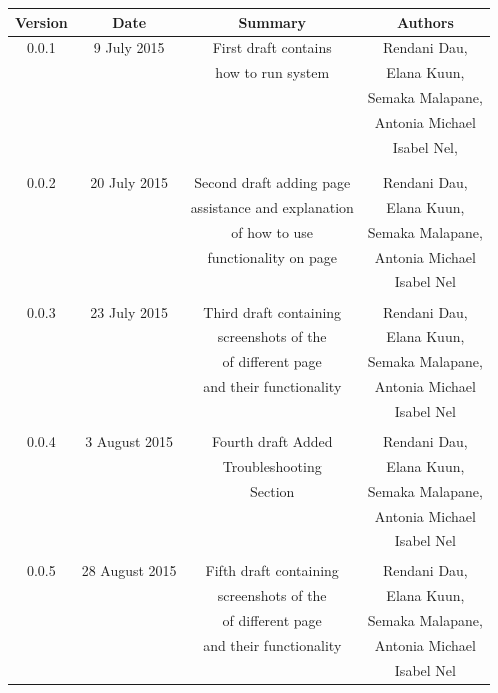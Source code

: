 \documentclass[a4paper,12pt]{report}
\begin{document}
\begin{table}[h!]
\centering
 \begin{tabular}{||c c c c||} 
 \hline
 \textbf{Version} & \textbf{Date} & \textbf{Summary} & \textbf{Authors} \\ [0.5ex] 
 \hline\hline
 0.0.1 & 9 July 2015 &  First draft contains & Rendani Dau, \\ & & how to run system & Elana Kuun, \\ & & & Semaka Malapane, \\ & & & Antonia Michael \\ & & & Isabel Nel, \\ & & & \\
 \hline 
 & & & \\
 0.0.2 & 20 July 2015 &  Second draft adding page  & Rendani Dau, \\ & & assistance and explanation & Elana Kuun, \\ & & of how to use & Semaka Malapane, \\ & & functionality on page &  Antonia Michael \\ & & & Isabel Nel \\   [1ex]  
 \hline 
 & & & \\
 0.0.3& 23 July 2015 &  Third draft containing  & Rendani Dau, \\ & & screenshots of the & Elana Kuun, \\ & & of different page & Semaka Malapane, \\ & & and their functionality &  Antonia Michael \\ & & & Isabel Nel \\   [1ex]  
 \hline
 & & & \\
 0.0.4& 3 August 2015 &  Fourth draft Added  & Rendani Dau, \\ & & Troubleshooting & Elana Kuun, \\ & & Section & Semaka Malapane, \\ & &  &  Antonia Michael \\ & & & Isabel Nel \\   [1ex]  
  \hline 
 & & & \\
 0.0.5& 28 August 2015 &  Fifth draft containing  & Rendani Dau, \\ & & screenshots of the & Elana Kuun, \\ & & of different page & Semaka Malapane, \\ & & and their functionality &  Antonia Michael \\ & & & Isabel Nel \\   [1ex]  

\end{tabular}
\end{table}
\end{document}
